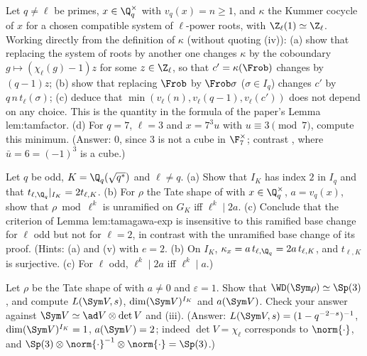 \begin{exercise}\label{ex:local:ex-cprime}
Let $q\ne\ell$ be primes, $x\in\Q_q^\times$ with $v_q(x)=n\ge1$, and $\kappa$ the Kummer cocycle of $x$ for a chosen compatible system of $\ell$-power roots,
with $\Z_\ell(1)\simeq\Z_\ell$. Working directly from the definition of $\kappa$ (without quoting (iv)): (a) show that
replacing the system of roots by another one changes $\kappa$ by the coboundary $g\mapsto(\chi_\ell(g)-1)z$ for some $z\in\Z_\ell$, so that
$c'=\kappa(\Frob)$ changes by $(q-1)z$; (b) show that replacing $\Frob$ by $\Frob\sigma$ ($\sigma\in I_q$) changes $c'$ by $q\,n\,t_\ell(\sigma)$; (c) deduce that
$\min(v_\ell(n),v_\ell(q-1),v_\ell(c'))$ does not depend on any choice. This is the quantity in the formula of the paper's Lemma lem:tamfactor. (d) For
$q=7$, $\ell=3$ and $x=7^3u$ with $u\equiv3\pmod7$, compute this minimum. (Answer: $0$, since $3$ is not a cube in $\F_7^\times$; contrast
, where $\bar u=6=(-1)^3$ is a cube.)
\end{exercise}

\begin{exercise}\label{ex:local:ex-ramified-basechange}
Let $q$ be odd, $K=\Q_q(\sqrt{q^*})$ and $\ell\ne q$. (a) Show that $I_K$ has index $2$ in $I_q$ and that $t_{\ell,\Q_q}|_{I_K}=2t_{\ell,K}$. (b) For $\rho$ the Tate shape of
 with $x\in\Q_q^\times$, $a=v_q(x)$, show that $\rho\bmod\ell^k$ is unramified on $G_K$ iff $\ell^k\mid2a$. (c) Conclude that the criterion of
Lemma lem:tamagawa-exp is insensitive to this ramified base change for $\ell$ odd but not for $\ell=2$, in contrast with the unramified base change of its proof.
(Hints: (a)  and (v) with $e=2$. (b) On $I_K$, $\kappa_x=a\,t_{\ell,\Q_q}=2a\,t_{\ell,K}$, and $t_{\ell,K}$ is
surjective. (c) For $\ell$ odd, $\ell^k\mid2a$ iff $\ell^k\mid a$.)
\end{exercise}

\begin{exercise}\label{ex:local:ex-sym2}
Let $\rho$ be the Tate shape of  with $a\ne0$ and $\varepsilon=1$. Show that $\WD(\Sym\rho)\simeq\Sp(3)$, and compute $L(\Sym V,s)$, $\dim(\Sym V)^{I_K}$
and $a(\Sym V)$. Check your answer against $\Sym V\simeq\ad V\otimes\det V$ and (iii). (Answer: $L(\Sym V,s)=(1-q^{-2-s})^{-1}$,
$\dim(\Sym V)^{I_K}=1$, $a(\Sym V)=2$; indeed $\det V=\chi_\ell$ corresponds to $\norm{\cdot}$, and $\Sp(3)\otimes\norm{\cdot}^{-1}\otimes\norm{\cdot}=\Sp(3)$.)
\end{exercise}

